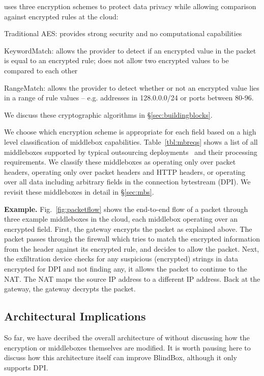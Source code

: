 \sys uses three encryption schemes to protect data privacy while allowing comparison against encrypted rules at the cloud: 

\begin{myitemize}
\item Traditional AES: provides strong security and no computational capabilities
\item KeywordMatch:  allows the provider to detect if an encrypted value in the packet is equal to an encrypted rule; does not allow two encrypted values to be compared to each other
\item RangeMatch: allows the provider to detect whether or not an encrypted value lies in a range of rule values -- e.g. addresses in 128.0.0.0/24 or ports between 80-96.
\end{myitemize}
We discuss these cryptographic algorithms in \S\ref{sec:buildingblocks}.

We choose which encryption scheme is appropriate for each field based on a high level classification of middlebox capabilities.
Table~\ref{tbl:mbreqs} shows a list of all middleboxes supported by typical outsourcing deployments~\cite{aplomb} and their processing requirements.
We classify these middleboxes as operating only over packet headers, operating only over packet headers and HTTP headers, or operating over all data including arbitrary fields in the connection bytestream (DPI).
We revisit these middleboxes in detail in \S\ref{sec:mbs}.

{\bf Example.} Fig.~\ref{fig:packetflow} shows the end-to-end flow of a packet through three example middleboxes in the cloud, each middlebox operating over an encrypted field.  
First,  the gateway encrypts the packet as explained above. The packet passes through the firewall which tries to match the encrypted information from the header against its encrypted rule, and decides to allow the packet. Next, the exfiltration device checks for any suspicious (encrypted) strings in data encrypted for DPI and not finding any, it allows the packet  to continue to the NAT. The NAT maps the source IP address to a different IP address. Back at the gateway, the gateway decrypts the packet. 

\subsection{Architectural Implications}
So far, we have decribed the overall architecture of \sys without discussing how the encryption or middleboxes themselves are modified.
It is worth pausing here to discuss how this architecture itself can improve BlindBox, although it only supports DPI.

